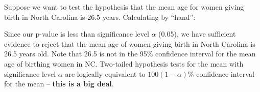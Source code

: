 \documentclass[]{book}
\newenvironment{Shaded}{\begin{snugshade}}{\end{snugshade}}
\newcommand{\KeywordTok}[1]{\textcolor[rgb]{0.13,0.29,0.53}{\textbf{#1}}}
\newcommand{\DataTypeTok}[1]{\textcolor[rgb]{0.13,0.29,0.53}{#1}}
\newcommand{\DecValTok}[1]{\textcolor[rgb]{0.00,0.00,0.81}{#1}}
\newcommand{\FloatTok}[1]{\textcolor[rgb]{0.00,0.00,0.81}{#1}}
\newcommand{\StringTok}[1]{\textcolor[rgb]{0.31,0.60,0.02}{#1}}
\newcommand{\CommentTok}[1]{\textcolor[rgb]{0.56,0.35,0.01}{\textit{#1}}}
\newcommand{\OtherTok}[1]{\textcolor[rgb]{0.56,0.35,0.01}{#1}}
\newcommand{\OperatorTok}[1]{\textcolor[rgb]{0.81,0.36,0.00}{\textbf{#1}}}
\newcommand{\NormalTok}[1]{#1}
\theoremstyle{definition}
\theoremstyle{definition}
\theoremstyle{definition}
\theoremstyle{remark}
\begin{document}
\begin{Shaded}
\end{Shaded}

Suppose we want to test the hypothesis that the mean age for women
giving birth in North Carolina is 26.5 years. Calculating by ``hand'':

\begin{Shaded}
\end{Shaded}

Since our p-value is less than significance level \(\alpha\) (0.05), we
have sufficient evidence to reject that the mean age of women giving
birth in North Carolina is 26.5 years old. Note that 26.5 is not in the
95\% confidence interval for the mean age of birthing women in NC.
Two-tailed hypothesis tests for the mean with significance level
\(\alpha\) are logically equivalent to \(100(1-\alpha)\%\) confidence
interval for the mean -- \textbf{this is a big deal}.
\end{document}
